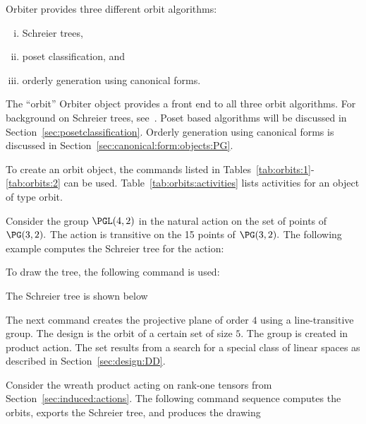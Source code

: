 
Orbiter provides three different orbit algorithms: 
\begin{enumerate}[(i)]
\item
Schreier trees, 
\item
poset classification, and 
\item
orderly generation using canonical forms. 
\end{enumerate}
The ``orbit'' Orbiter object provides a front end to all three orbit algorithms. 
For background on Schreier trees, see~\cite{Butler91,Holt05,Seress03}.
Poset based algorithms will be discussed in Section~\ref{sec:posetclassification}.
Orderly generation using canonical forms is discussed in 
Section~\ref{sec:canonical:form:objects:PG}.

\bigskip


To create an orbit object, the commands listed in 
Tables~\ref{tab:orbits:1}-\ref{tab:orbits:2} can be used.
Table~\ref{tab:orbits:activities} lists activities for an object of type orbit.




\bigskip

Consider the group $\PGL(4,2)$ in the natural action on the set of points of $\PG(3,2).$ 
The action is transitive on the 15 points of $\PG(3,2).$ 
The following example computes the Schreier tree for the action:


To draw the tree, the following command is used:


The Schreier tree is shown below


\bigskip


The next command creates the projective plane of order $4$ 
using a line-transitive group. 
The design is the orbit of a certain set of size $5.$
The group is created in product action. 
The set results from a search for a special class of linear spaces 
as described in Section~\ref{sec:design:DD}.



\bigskip

Consider the wreath product acting on rank-one tensors 
from Section~\ref{sec:induced:actions}.
The following command sequence computes the orbits, 
exports the Schreier tree, and produces the drawing 

